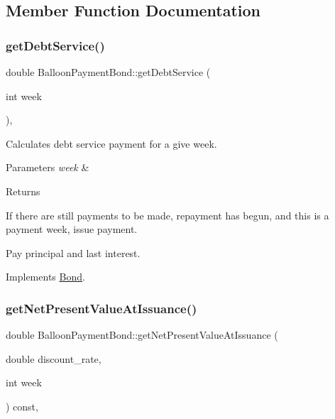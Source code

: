 \subsection{Member Function Documentation}
\mbox{\label{classBalloonPaymentBond_a8648a2ae688f90a3b2e6689711c22b9d_a8648a2ae688f90a3b2e6689711c22b9d}} 
\subsubsection{\texorpdfstring{get\+Debt\+Service()}{getDebtService()}}
{\footnotesize\ttfamily double Balloon\+Payment\+Bond\+::get\+Debt\+Service (\begin{DoxyParamCaption}\item[{int}]{week }\end{DoxyParamCaption})\hspace{0.3cm}{\ttfamily [override]}, {\ttfamily [virtual]}}

Calculates debt service payment for a give week. 
\begin{DoxyParams}{Parameters}
{\em week} & \\
\hline
\end{DoxyParams}
\begin{DoxyReturn}{Returns}

\end{DoxyReturn}
If there are still payments to be made, repayment has begun, and this is a payment week, issue payment.

Pay principal and last interest. 

Implements \mbox{\hyperlink{classBond_a98d8ecaf4b36319674ebd220598996bc_a98d8ecaf4b36319674ebd220598996bc}{Bond}}.

\mbox{\label{classBalloonPaymentBond_a11e5aecaf542cfbbb2303e98fb0b93bf_a11e5aecaf542cfbbb2303e98fb0b93bf}} 
\subsubsection{\texorpdfstring{get\+Net\+Present\+Value\+At\+Issuance()}{getNetPresentValueAtIssuance()}}
{\footnotesize\ttfamily double Balloon\+Payment\+Bond\+::get\+Net\+Present\+Value\+At\+Issuance (\begin{DoxyParamCaption}\item[{double}]{discount\+\_\+rate,  }\item[{int}]{week }\end{DoxyParamCaption}) const\hspace{0.3cm}{\ttfamily [override]}, {\ttfamily [virtual]}}



